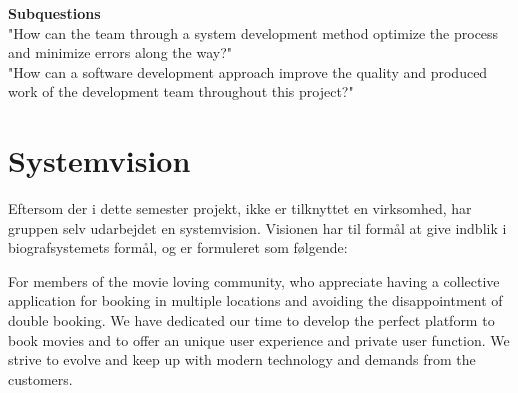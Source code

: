 \textbf{Subquestions} \\
"How can the team through a system development method optimize the process and minimize errors along the way?" \\

"How can a software development approach improve the quality and produced work of the development team throughout this project?"\\

\section{Systemvision}
Eftersom der i dette semester projekt, ikke er tilknyttet en virksomhed, har gruppen selv udarbejdet en systemvision.
Visionen har til formål at give indblik i biografsystemets formål, og er formuleret som følgende:

For members of the movie loving community, who appreciate having a collective application for booking 
in multiple locations and avoiding the disappointment of double booking. We have dedicated our 
time to develop the perfect platform to book movies and to offer an unique user experience and private user function. 
We strive to evolve and keep up with modern technology and demands from the customers. \\
















